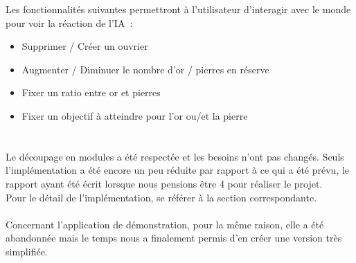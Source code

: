 Les fonctionnalités suivantes permettront à l'utilisateur d'interagir avec le monde pour voir la réaction de l'IA~:
\begin{itemize}
\item Supprimer / Créer un ouvrier
\item Augmenter / Diminuer le nombre d'or / pierres en réserve
\item Fixer un ratio entre or et pierres
\item Fixer un objectif à atteindre pour l'or ou/et la pierre
\end{itemize}

\section{{\color{blue}{Notes sur les besoins}}}

Le découpage en modules a été respectée et les besoins n'ont pas changés. Seuls l'implémentation a été encore un peu réduite par rapport à ce qui a été prévu, le rapport ayant été écrit lorsque nous pensions être 4 pour réaliser le projet.\\
Pour le détail de l'implémentation, se référer à la section correspondante.\\\\

Concernant l'application de démonstration, pour la même raison, elle a été abandonnée mais le temps nous a finalement permis d'en créer une version très simplifiée.

